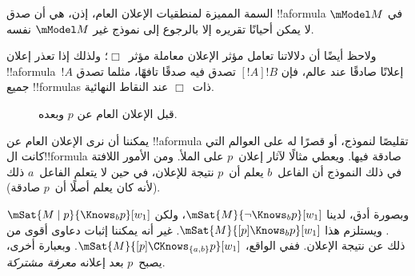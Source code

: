 \documentclass[../../../include/open-logic-section]{subfiles}
\begin{document}
السمة المميزة لمنطقيات الإعلان العام، إذن، هي أن صدق !!a{formula} في
$\mModel M$ لا يمكن أحيانًا تقريره إلا بالرجوع إلى نموذج غير
$\mModel M$ نفسه.

ولاحظ أيضًا أن دلالاتنا تعامل مؤثر الإعلان معاملة مؤثر~$\Box$؛ ولذلك
إذا تعذر إعلان !!a{formula}~$!A$ إعلانًا صادقًا عند عالم، فإن
$[!A]!B$ تصدق فيه صدقًا تافهًا، مثلما تصدق جميع !!{formula}s
ذات~$\Box$ عند النقاط النهائية.

\begin{figure}
  \begin{center}
  \end{center}
  \caption{قبل الإعلان العام عن $p$ وبعده.}
\end{figure}

يمكننا أن نرى الإعلان العام عن !!a{formula} تقليصًا لنموذج، أو قصرًا
له على العوالم التي كانت ال!!{formula} صادقة فيها. ويعطي
 مثالًا لآثار إعلان~$p$ على الملأ.
ومن الأمور اللافتة في ذلك النموذج أن الفاعل~$b$ يعلم أن~$p$ نتيجة
للإعلان، في حين لا يتعلم الفاعل~$a$ ذلك (لأنه كان يعلم أصلًا أن~$p$
صادقة).

وبصورة أدق، لدينا $\mSat{M}{\lnot \Knows_b p}[w_1]$، ولكن
$\mSat{M \mid p}{\Knows_b p}[w_1]$. ويستلزم هذا
$\mSat{M}{[p] \Knows_b p}[w_1]$. غير أنه يمكننا إثبات دعاوى أقوى من
ذلك عن نتيجة الإعلان. ففي الواقع،
$\mSat{M}{[p]\CKnows_{\{a,b\}} p}[w_1]$. وبعبارة أخرى، يصبح~$p$ بعد
إعلانه \emph{معرفة مشتركة}.
\end{document}
